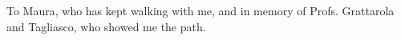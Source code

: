 \begin{dedication}
To Maura, who has kept walking with me, and in memory of Profs. Grattarola and Tagliasco, who showed me the path.
\end{dedication}




